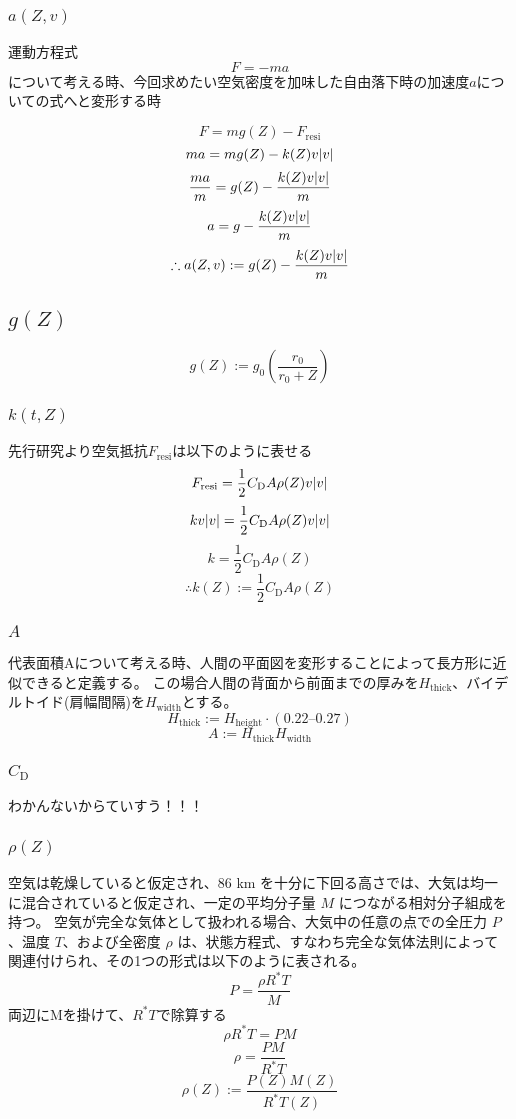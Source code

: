 \documentclass[a4paper,12pt]{article}
\begin{document}
\subsubsection{$a(Z, v)$}
運動方程式
\[
  F = -ma
\]
について考える時、今回求めたい空気密度を加味した自由落下時の加速度$a$についての式へと変形する時

\[
  F = mg(Z) - F_{\mathrm{resi}}
\]
\[
  ma = mg(Z) - k(Z)v\abs{v}
\]
\[
  \frac{ma}{m} = g(Z) - \frac{k(Z)v\abs{v}}{m}
\]
\[
  a = g - \frac{k(Z)v\abs{v}}{m}
\]
\[
  \therefore a(Z, v) := g(Z) - \frac{k(Z)v\abs{v}}{m}
\]

\subsection{$g(Z)$}

\[
  g(Z) := g_0\left(\frac{r_0}{r_0+Z}\right)
\]
\subsubsection{$k(t, Z)$}
先行研究より空気抵抗$F_{\mathrm{resi}}$は以下のように表せる
\[
  F_{\mathrm{resi}} = \frac{1}{2}C_{\mathrm{D}}A\rho(Z)v\abs{v}
\]
\[
  kv\abs{v} = \frac{1}{2}C_{\mathrm{D}}A\rho(Z)v\abs{v}
\]
\[
  k = \frac{1}{2}C_{\mathrm{D}}A\rho(Z)
\]
\[
  \therefore k(Z) := \frac{1}{2}C_{\mathrm{D}}A\rho(Z)
\]

\subsubsection{$A$}
代表面積Aについて考える時、人間の平面図を変形することによって長方形に近似できると定義する。
この場合人間の背面から前面までの厚みを$H_{\mathrm{thick}}$、バイデルトイド(肩幅間隔)を$H_{\mathrm{width}}$とする。
\[
H_{\mathrm{thick}} := H_{\mathrm{height}} \cdot (0.22 \text{--} 0.27)
\]
\[
A := H_{\mathrm{thick}} H_{\mathrm{width}}
\]

\subsubsection{$C_{\mathrm{D}}$}
わかんないからていすう！！！ %


\subsubsection{$\rho(Z)$}
空気は乾燥していると仮定され、86 km を十分に下回る高さでは、大気は均一に混合されていると仮定され、一定の平均分子量 $M$ につながる相対分子組成を持つ。
空気が完全な気体として扱われる場合、大気中の任意の点での全圧力 $P$、温度 $T$、および全密度 $\rho$ は、状態方程式、すなわち完全な気体法則によって関連付けられ、その1つの形式は以下のように表される。
\[
P = \frac{\rho R^* T}{M}
\]
両辺にMを掛けて、$R^*T$で除算する
\[
\rho R^* T = PM
\]
\[
  \rho = \frac{P M}{R^* T}
\]
\[
  \rho(Z) := \frac{P(Z) M(Z)}{R^* T(Z)}
\]
\end{document}
